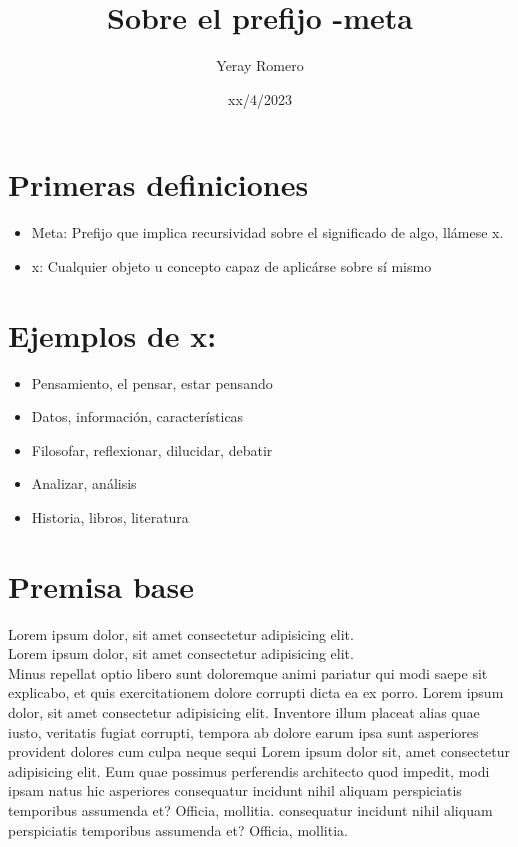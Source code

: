 \documentclass{article}
\title{Sobre el prefijo -meta}
\date{xx/4/2023}
\author{Yeray Romero}
\begin{document}
\maketitle

\section{Primeras definiciones}
\begin{itemize}
\item Meta: Prefijo que implica recursividad sobre el significado de algo, llámese x.
\item x: Cualquier objeto u concepto capaz de aplicárse sobre sí mismo
\end{itemize}
\section{Ejemplos de x:}
\begin{itemize}
\item Pensamiento, el pensar, estar pensando
\item Datos, información, características
\item Filosofar, reflexionar, dilucidar, debatir
\item Analizar, análisis
\item Historia, libros, literatura
\end{itemize}
\section{Premisa base}
Lorem ipsum dolor, sit amet consectetur adipisicing elit. \\
Lorem ipsum dolor, sit amet consectetur adipisicing elit. \\
Minus repellat optio libero sunt doloremque animi pariatur qui modi saepe sit explicabo, et quis exercitationem dolore corrupti dicta ea ex porro. Lorem ipsum dolor, sit amet consectetur adipisicing elit. Inventore illum placeat alias quae iusto, veritatis fugiat corrupti, tempora ab dolore earum ipsa sunt asperiores provident dolores cum culpa neque sequi Lorem ipsum dolor sit, amet consectetur adipisicing elit. Eum quae possimus perferendis architecto quod impedit, modi ipsam natus hic asperiores consequatur incidunt nihil aliquam perspiciatis temporibus assumenda et? Officia, mollitia. consequatur incidunt nihil aliquam perspiciatis temporibus assumenda et? Officia, mollitia.
\end{document}
